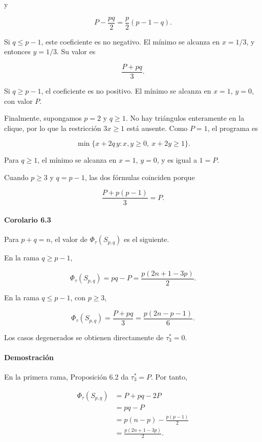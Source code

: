 \documentclass[spanish,11pt,a4paper]{article}
\begin{document}
y

\[
P-\frac{pq}{2}
=
\frac p2(p-1-q).
\]

Si \(q\le p-1\), este coeficiente es no negativo. El mínimo se alcanza
en \(x=1/3\), y entonces \(y=1/3\). Su valor es

\[
\frac{P+pq}{3}.
\]

Si \(q\ge p-1\), el coeficiente es no positivo. El mínimo se alcanza en
\(x=1\), \(y=0\), con valor \(P\).

Finalmente, supongamos \(p=2\) y \(q\ge1\). No hay triángulos
enteramente en la clique, por lo que la restricción \(3x\ge1\) está
ausente. Como \(P=1\), el programa es

\[
\min\{x+2q\,y:x,y\ge0,\ x+2y\ge1\}.
\]

Para \(q\ge1\), el mínimo se alcanza en \(x=1\), \(y=0\), y es igual a
\(1=P\).

Cuando \(p\ge3\) y \(q=p-1\), las dos fórmulas coinciden porque

\[
\frac{P+p(p-1)}{3}=P.
\]

\paragraph{Corolario 6.3}\label{corolario-6.3}

Para \(p+q=n\), el valor de \(\Phi_\tau(S_{p,q})\) es el siguiente.

En la rama \(q\ge p-1\),

\[
\Phi_\tau(S_{p,q})
=
pq-P
=
\frac{p(2n+1-3p)}2.
\tag{6.1}
\]

En la rama \(q\le p-1\), con \(p\ge3\),

\[
\Phi_\tau(S_{p,q})
=
\frac{P+pq}{3}
=
\frac{p(2n-p-1)}6.
\tag{6.2}
\]

Los casos degenerados se obtienen directamente de \(\tau_3^*=0\).

\paragraph{Demostración}\label{demostraciuxf3n-10}

En la primera rama, Proposición 6.2 da \(\tau_3^*=P\). Por tanto,

\[
\begin{aligned}
\Phi_\tau(S_{p,q})
&=
P+pq-2P\\
&=
pq-P\\
&=
p(n-p)-\frac{p(p-1)}2\\
&=
\frac{p(2n+1-3p)}2.
\end{aligned}
\]
\end{document}
